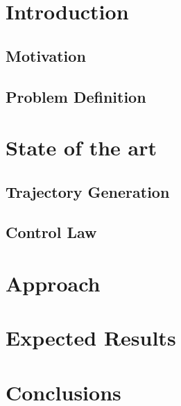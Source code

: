 \documentclass[english, oneside]{ist-thesis}
\begin{document}
\makecover

\tableofcontents
\clearpage

\mainstart

 
\section{Introduction}

\subsection{Motivation}


\subsection{Problem Definition}


\section{State of the art}
\subsection{Trajectory Generation}


\subsection{Control Law}


\section{Approach}

\section{Expected Results}

\section{Conclusions}


\nocite{latex-companion, fontcatalogue, latexwiki, ctan, texsx}


\printbibliography[heading = bibintoc]

\appendix
\end{document}
